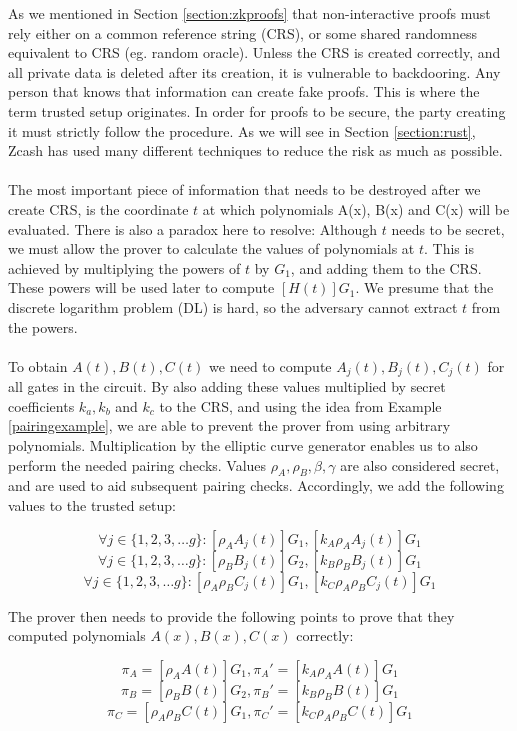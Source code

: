 \noindent As we mentioned in Section \ref{section:zkproofs} that non-interactive proofs must rely either on a common reference string (CRS), or some shared randomness equivalent to CRS (eg. random oracle). Unless the CRS is created correctly, and all private data is deleted after its creation, it is vulnerable to backdooring. Any person that knows that information can create fake proofs. This is where the term trusted setup originates. In order for proofs to be secure, the party creating it must strictly follow the procedure. As we will see in Section \ref{section:rust}, Zcash has used many different techniques to reduce the risk as much as possible.\\
\\
The most important piece of information that needs to be destroyed after we create CRS, is the coordinate $t$ at which polynomials A(x), B(x) and C(x) will be evaluated. There is also a paradox here to resolve: Although $t$ needs to be secret, we must allow the prover to calculate the values of polynomials at $t$. This is achieved by multiplying the powers of $t$ by $G_1$, and adding them to the CRS. These powers will be used later to compute $[H(t)]G_1$. We presume that the discrete logarithm problem (DL) is hard, so the adversary cannot extract $t$ from the powers.\\
\\
To obtain $A(t), B(t), C(t)$ we need to compute $A_j(t), B_j(t), C_j(t)$ for all gates in the circuit. By also adding these values multiplied by secret coefficients $k_a, k_b$ and $k_c$ to the CRS, and using the idea from Example \ref{pairingexample}, we are able to prevent the prover from using arbitrary polynomials. Multiplication by the elliptic curve generator enables us to also perform the needed pairing checks. Values $\rho_A, \rho_B, \beta, \gamma$ are also considered secret, and are used to aid subsequent pairing checks. Accordingly, we add the following values to the trusted setup:

$$\forall j \in \{1, 2, 3, \ldots g\} : [\rho_A A_j(t)]G_1, [k_A \rho_A A_j(t)]G_1 $$
$$\forall j \in \{1, 2, 3, \ldots g\} : [\rho_B B_j(t)]G_2, [k_B \rho_B B_j(t)]G_1 $$ 
$$\forall j \in \{1, 2, 3, \ldots g\} : [\rho_A \rho_B C_j(t)]G_1, [k_C \rho_A \rho_B C_j(t)]G_1 $$ 

\noindent The prover then needs to provide the following points to prove that they computed polynomials $A(x), B(x), C(x)$ correctly:

$$\pi_A = [\rho_A A(t)]G_1, \pi_A' = [k_A \rho_A A(t)]G_1$$
$$\pi_B = [\rho_B B(t)]G_2, \pi_B' = [k_B \rho_B B(t)]G_1$$
$$\pi_C = [\rho_A \rho_B C(t)]G_1, \pi_C' = [k_C \rho_A \rho_B C(t)]G_1$$

